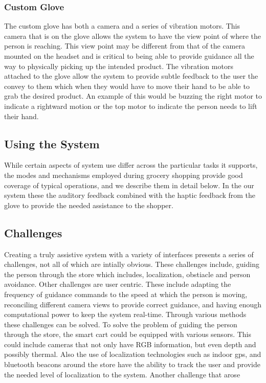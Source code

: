 \subsubsection{Custom Glove}
The custom glove has both a camera and a series of vibration motors.
This camera that is on the glove allows the system to have the view
 point of where the person is reaching. This view point may be different from
that of the camera mounted on the headset and is critical to being able to provide
guidance all the way to physically picking up the intended product.
The vibration motors attached to the glove allow the system to provide
subtle feedback to the user the convey to them which when they would
have to move their hand to be able to grab the desired product. An
example of this would be buzzing the right motor to indicate a
rightward motion or the top motor to indicate the person needs to lift
their hand.


\subsection{Using the System}
While certain aspects of system use differ across the particular tasks it supports, the modes and mechanisms employed during grocery shopping provide good coverage of typical operations, and we describe them in detail below.
In the our system these the auditory feedback combined with the haptic feedback from the glove
to provide the needed assistance to the shopper. 

\subsection{Challenges}
Creating a truly assistive system with a variety of interfaces presents a series 
of challenges, not all of which are intially obvious. These challenges include, guiding the person
through the store which includes, localization, obstiacle and person avoidance. Other challenges are
user centric. These include adapting the frequency of guidance commands to the speed at which the person is moving, 
reconciling different camera views to provide correct guidance, and having enough computational power to keep the system real-time. 
Through various methods these challenges can be solved. To solve the problem of guiding the person through the store, the smart cart could be equipped with various sensors. This could include cameras that not only have RGB information, but even depth and possibly thermal. Also the use of
localization technologies such as indoor gps, and bluetooth beacons around the store have the ability to track the user and provide the needed level of localization to the system.
Another challenge that arose


